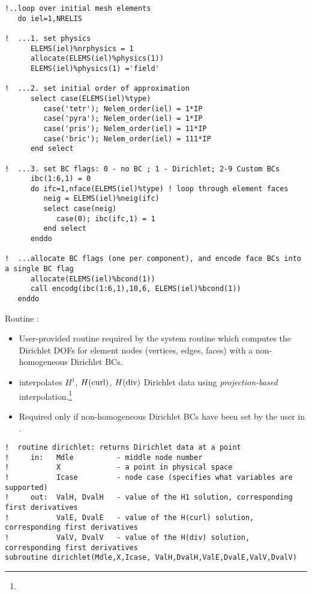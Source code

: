 \begin{lstlisting}[caption=\file{MPI\_POISSON/GALERKIN/}\routine{set\_initial\_mesh} routine.]
!..loop over initial mesh elements
   do iel=1,NRELIS

!  ...1. set physics
      ELEMS(iel)%nrphysics = 1
      allocate(ELEMS(iel)%physics(1))
      ELEMS(iel)%physics(1) ='field'

!  ...2. set initial order of approximation
      select case(ELEMS(iel)%type)
         case('tetr'); Nelem_order(iel) = 1*IP
         case('pyra'); Nelem_order(iel) = 1*IP
         case('pris'); Nelem_order(iel) = 11*IP
         case('bric'); Nelem_order(iel) = 111*IP
      end select

!  ...3. set BC flags: 0 - no BC ; 1 - Dirichlet; 2-9 Custom BCs
      ibc(1:6,1) = 0
      do ifc=1,nface(ELEMS(iel)%type) ! loop through element faces
         neig = ELEMS(iel)%neig(ifc)
         select case(neig)
            case(0); ibc(ifc,1) = 1
         end select
      enddo

!  ...allocate BC flags (one per component), and encode face BCs into a single BC flag
      allocate(ELEMS(iel)%bcond(1))
      call encodg(ibc(1:6,1),10,6, ELEMS(iel)%bcond(1))
   enddo
\end{lstlisting}

Routine :
\begin{itemize}
	\item User-provided routine required by the system routine  which computes the Dirichlet DOFs for element nodes (vertices, edges, faces) with a non-homogeneous Dirichlet BCs. 
	\item {} interpolates $H^1$, $H(\text{curl})$, $H(\text{div})$ Dirichlet data using \emph{projection-based} interpolation.\footnote{}
	\item Required only if non-homogeneous Dirichlet BCs have been set by the user in .
\end{itemize}

\begin{lstlisting}[caption=\file{MPI\_POISSON/GALERKIN/common/}\routine{dirichlet} routine.]
!  routine dirichlet: returns Dirichlet data at a point
!     in:   Mdle          - middle node number
!           X             - a point in physical space
!           Icase         - node case (specifies what variables are supported)
!     out:  ValH, DvalH   - value of the H1 solution, corresponding first derivatives
!           ValE, DvalE   - value of the H(curl) solution, corresponding first derivatives
!           ValV, DvalV   - value of the H(div) solution, corresponding first derivatives
subroutine dirichlet(Mdle,X,Icase, ValH,DvalH,ValE,DvalE,ValV,DvalV)
\end{lstlisting}

